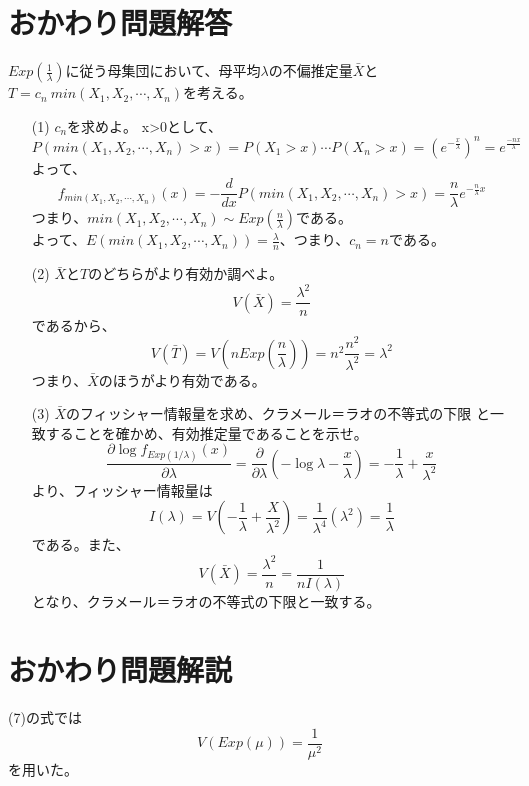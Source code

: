 \documentclass[a4j,uplatex,dvipdfmx]{jsarticle}
\begin{document}
\section*{おかわり問題解答}
$Exp(\frac{1}{\lambda})$に従う母集団において、母平均$\lambda$の不偏推定量$\bar{X}$と
$T=c_n~min(X_1,X_2,\cdots,X_n)$を考える。
\begin{itemize}
  \item[(1)]$c_n$を求めよ。
   x>0として、
   \begin{equation}
     P(min(X_1,X_2,\cdots,X_n)>x)=P(X_1>x)\cdots P(X_n>x)=(e^{-\frac{x}{\lambda}})^n=e^{\frac{-nx}{\lambda}}
   \end{equation}
   よって、
   \begin{equation}
     f_{min(X_1,X_2,\cdots,X_n)}(x)=-\frac{d}{dx}P(min(X_1,X_2,\cdots,X_n)>x)=\frac{n}{\lambda}e^{-\frac{n}{\lambda}x}
   \end{equation}
   つまり、$min(X_1,X_2,\cdots,X_n)\sim Exp\left( \frac{n}{\lambda} \right)$である。\\
   よって、$E(min(X_1,X_2,\cdots,X_n))=\frac{\lambda}{n}$、つまり、$c_n=n$である。\\
   \item[(2)]$\bar{X}$と$T$のどちらがより有効か調べよ。
   \begin{equation}
     V(\bar{X})=\frac{\lambda ^2}{n}
   \end{equation} 
   であるから、
   \begin{equation}
     V(\bar{T})=V\left( nExp\left( \frac{n}{\lambda} \right) \right) = n^2 \frac{n^2}{\lambda ^2}=\lambda ^2
   \end{equation}
   つまり、$\bar{X}$のほうがより有効である。\\
  \item[(3)]$\bar{X}$のフィッシャー情報量を求め、クラメール＝ラオの不等式の下限
  と一致することを確かめ、有効推定量であることを示せ。
   \begin{equation}
     \frac{\partial \log{f_{Exp(1/\lambda)}(x)}}{\partial \lambda}=\frac{\partial}{\partial \lambda}\left( -\log{\lambda}-\frac{x}{\lambda} \right)
     =-\frac{1}{\lambda}+\frac{x}{\lambda^2}
   \end{equation}
   より、フィッシャー情報量は
   \begin{equation}
    I(\lambda)=V\left( -\frac{1}{\lambda}+\frac{X}{\lambda ^2} \right)=\frac{1}{\lambda ^4}(\lambda ^2)=\frac{1}{\lambda}
   \end{equation}
   である。また、
   \begin{equation}
     V(\bar{X})=\frac{\lambda ^2}{n}=\frac{1}{nI(\lambda)}
   \end{equation}
   となり、クラメール＝ラオの不等式の下限と一致する。

\end{itemize}
\section*{おかわり問題解説}
(7)の式では
\begin{equation}
  V(Exp(\mu))=\frac{1}{\mu ^2}
\end{equation}
を用いた。
\end{document}
